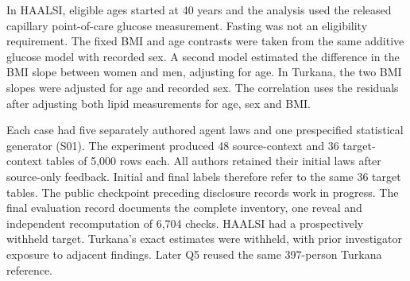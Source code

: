 \documentclass[11pt,letterpaper]{article}
\begin{document}
In HAALSI, eligible ages started at 40 years and the analysis used the released capillary point-of-care glucose measurement. Fasting was not an eligibility requirement. The fixed BMI and age contrasts were taken from the same additive glucose model with recorded sex. A second model estimated the difference in the BMI slope between women and men, adjusting for age. In Turkana, the two BMI slopes were adjusted for age and recorded sex. The correlation uses the residuals after adjusting both lipid measurements for age, sex and BMI.


Each case had five separately authored agent laws and one prespecified statistical generator (S01). The experiment produced 48 source-context and 36 target-context tables of 5,000 rows each. All authors retained their initial laws after source-only feedback. Initial and final labels therefore refer to the same 36 target tables. The public checkpoint preceding disclosure records work in progress. The final evaluation record documents the complete inventory, one reveal and independent recomputation of 6,704 checks. HAALSI had a prospectively withheld target. Turkana's exact estimates were withheld, with prior investigator exposure to adjacent findings. Later Q5 reused the same 397-person Turkana reference.


\FloatBarrier

\begingroup

\small

\renewcommand{\arraystretch}{1.22}
\end{document}
